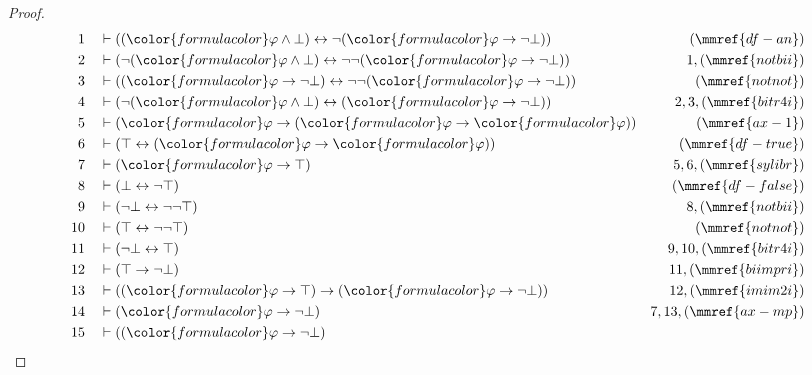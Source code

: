 \begin{proof}
\begin{align}
  1 && & \vdash ( ( {\color{formulacolor}\varphi} \wedge \bot ) \leftrightarrow
      \lnot ( {\color{formulacolor}\varphi} \rightarrow
      \lnot \bot ) )&(\mmref{df-an})\notag
  \\ 2 && & \vdash ( \lnot ( {\color{formulacolor}\varphi} \wedge \bot )
      \leftrightarrow \lnot \lnot (
      {\color{formulacolor}\varphi} \rightarrow \lnot \bot
      ) )&1,(\mmref{notbii})\notag
  \\ 3 && & \vdash ( ( {\color{formulacolor}\varphi} \rightarrow \lnot \bot )
      \leftrightarrow \lnot \lnot (
      {\color{formulacolor}\varphi} \rightarrow \lnot \bot
      ) )&(\mmref{notnot})\notag
  \\ 4 && & \vdash ( \lnot ( {\color{formulacolor}\varphi} \wedge \bot )
      \leftrightarrow ( {\color{formulacolor}\varphi}
      \rightarrow \lnot \bot )
      )&2,3,(\mmref{bitr4i})\notag
  \\ 5 && & \vdash ( {\color{formulacolor}\varphi} \rightarrow (
      {\color{formulacolor}\varphi} \rightarrow
      {\color{formulacolor}\varphi} )
      )&(\mmref{ax-1})\notag
  \\ 6 && & \vdash ( \top \leftrightarrow ( {\color{formulacolor}\varphi}
      \rightarrow {\color{formulacolor}\varphi} )
      )&(\mmref{df-true})\notag
  \\ 7 && & \vdash ( {\color{formulacolor}\varphi} \rightarrow \top
      )&5,6,(\mmref{sylibr})\notag
  \\ 8 && & \vdash ( \bot \leftrightarrow \lnot \top
      )&(\mmref{df-false})\notag
  \\ 9 && & \vdash ( \lnot \bot \leftrightarrow \lnot \lnot \top
      )&8,(\mmref{notbii})\notag
  \\ 10 && & \vdash ( \top \leftrightarrow \lnot \lnot \top
      )&(\mmref{notnot})\notag
  \\ 11 && & \vdash ( \lnot \bot \leftrightarrow \top
      )&9,10,(\mmref{bitr4i})\notag
  \\ 12 && & \vdash ( \top \rightarrow \lnot \bot )&11,(\mmref{biimpri})\notag
  \\ 13 && & \vdash ( ( {\color{formulacolor}\varphi} \rightarrow \top )
      \rightarrow ( {\color{formulacolor}\varphi}
      \rightarrow \lnot \bot ) )&12,(\mmref{imim2i})\notag
  \\ 14 && & \vdash ( {\color{formulacolor}\varphi} \rightarrow \lnot \bot
      )&7,13,(\mmref{ax-mp})\notag
  \\ 15 && & \vdash ( ( {\color{formulacolor}\varphi} \rightarrow \lnot \bot )

\end{align}
\end{proof}
